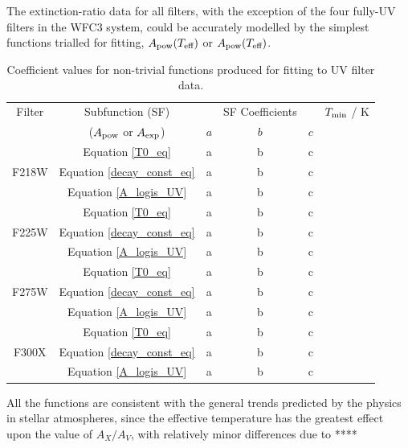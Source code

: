 \documentclass[12pt, a4paper]{report}
\begin{document}
The extinction-ratio data for all filters, with the exception of the four fully-UV filters in the WFC3 system, could be accurately modelled by the simplest functions trialled for fitting, $A_{\textnormal{pow}} (T_{\textnormal{eff}})$ or $A_{\textnormal{pow}} (T_{\textnormal{eff}})$.
\begin{table}
\begin{center}
\begin{tabular}{cccccc}
\hline

Filter &  Subfunction (SF) & & SF Coefficients & & $T_{\textnormal{min}}$ / K \\
 & ($A_{\textnormal{pow}}$ or $A_{\textnormal{exp}}$) & $a$ & $b$ & $c$ \\
\hline
& Equation \ref{T0_eq} & a & b & c \\
F218W & Equation \ref{decay_const_eq} & a & b & c \\
& Equation \ref{A_logis_UV} & a & b & c \\
& Equation \ref{T0_eq} & a & b & c \\
F225W & Equation \ref{decay_const_eq} & a & b & c \\
& Equation \ref{A_logis_UV} & a & b & c \\
& Equation \ref{T0_eq} & a & b & c \\
F275W & Equation \ref{decay_const_eq} & a & b & c \\
& Equation \ref{A_logis_UV} & a & b & c \\
& Equation \ref{T0_eq} & a & b & c \\
F300X & Equation \ref{decay_const_eq} & a & b & c \\
& Equation \ref{A_logis_UV} & a & b & c \\
\hline
\end{tabular}
\caption{Coefficient values for non-trivial functions produced for fitting to UV filter data.}
\label{UV_coeffs_table}
\end{center}
\end{table}

All the functions are consistent with the general trends predicted by the physics in stellar atmospheres, since the effective temperature has the greatest effect upon the value of $A_{X}/A_{V}$, with relatively minor differences due to ****
\end{document}
